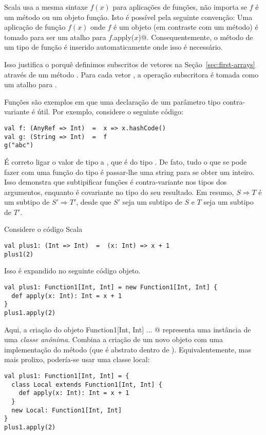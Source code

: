 Scala usa a mesma sintaxe $f(x)$ para aplicações de funções, não importa se 
$f$ é um método ou um objeto função. Isto é possível pela seguinte convenção:
Uma aplicação de função $f(x)$ onde $f$ é um objeto (em contraste com um método)
é tomado para ser um atalho para \lstinline@$f$.apply($x$)@. Consequentemente, 
o método  de um tipo de função é inserido automaticamente onde isso 
é necessário.

Isso justifica o porquê definimos subscritos de vetores na Seção~\ref{sec:first-arrays} 
através de um método . Para cada vetor , a operação subscritora  
é tomada como um atalho para .

Funções são exemplos em que uma declaração de um parâmetro tipo 
contra-variante é útil. Por exemplo, considere o seguinte código:

\begin{lstlisting}
val f: (AnyRef => Int)  =  x => x.hashCode()
val g: (String => Int)  =  f
g("abc")
\end{lstlisting}

É correto ligar o valor  de tipo  a , que 
é do tipo . De fato, tudo o que se pode fazer com uma 
função do tipo  é passar-lhe uma string para se obter um inteiro.
Isso demonstra que subtipificar funções é contra-variante nos tipos dos argumentos, enquanto 
é covariante no tipo do seu resultado. Em resumo, $S \Rightarrow T$ é um subtipo de $S' \Rightarrow T'$,
desde que  $S'$ seja um subtipo de $S$ e $T$ seja um subtipo de $T'$.

\example Considere o código Scala 
\begin{lstlisting}
val plus1: (Int => Int)  =  (x: Int) => x + 1
plus1(2)
\end{lstlisting}
Isso é expandido no seguinte código objeto.
\begin{lstlisting}
val plus1: Function1[Int, Int] = new Function1[Int, Int] {
  def apply(x: Int): Int = x + 1
}
plus1.apply(2)
\end{lstlisting}
Aqui, a criação do objeto \lstinline@new Function1[Int, Int]{ ... }@
representa uma instância de uma {\em classe anônima}. Combina a criação 
de um novo objeto  com uma implementação do método 
(que é abstrato dentro de ). Equivalentemente, mas mais
prolixo, podería-se usar uma classe local:
\begin{lstlisting}
val plus1: Function1[Int, Int] = {
  class Local extends Function1[Int, Int] {
    def apply(x: Int): Int = x + 1
  }
  new Local: Function1[Int, Int]
}
plus1.apply(2)
\end{lstlisting}

